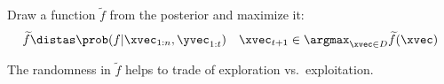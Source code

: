 \begin{defnbox}\nospacing
  \begin{defn}\label{defn:thompson_sampling}
    Draw a function $\widetilde{f}$ from the posterior and maximize it:
    \begin{align}
      \widetilde{f}\distas\prob(f|\xvec_{1:n},\yvec_{1:t})&&\xvec_{t+1}\in\argmax_{\xvec\in D}\widetilde{f}(\xvec)
    \end{align}
  \end{defn}
\end{defnbox}
\begin{explanationbox}
  \begin{explanation}
    The randomness in $\widetilde{f}$ helps to trade of exploration vs.\ exploitation.
  \end{explanation}
\end{explanationbox}
